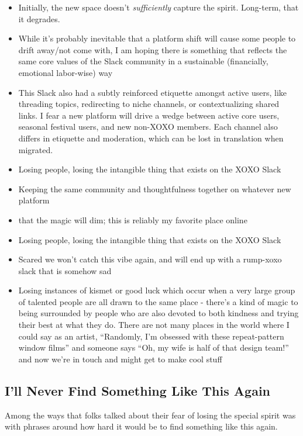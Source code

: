 \documentclass[
]{book}
\providecommand{\tightlist}{%
  \setlength{\itemsep}{0pt}\setlength{\parskip}{0pt}}
\begin{document}
\begin{itemize}
\tightlist
\item
  Initially, the new space doesn't \emph{sufficiently} capture the spirit. Long-term, that it degrades.
\item
  While it's probably inevitable that a platform shift will cause some people to drift away/not come with, I am hoping there is something that reflects the same core values of the Slack community in a sustainable (financially, emotional labor-wise) way
\item
  This Slack also had a subtly reinforced etiquette amongst active users, like threading topics, redirecting to niche channels, or contextualizing shared links. I fear a new platform will drive a wedge between active core users, seasonal festival users, and new non-XOXO members. Each channel also differs in etiquette and moderation, which can be lost in translation when migrated.
\item
  Losing people, losing the intangible thing that exists on the XOXO Slack
\item
  Keeping the same community and thoughtfulness together on whatever new platform
\item
  that the magic will dim; this is reliably my favorite place online
\item
  Losing people, losing the intangible thing that exists on the XOXO Slack
\item
  Scared we won't catch this vibe again, and will end up with a rump-xoxo slack that is somehow sad
\item
  Losing instances of kismet or good luck which occur when a very large group of talented people are all drawn to the same place - there's a kind of magic to being surrounded by people who are also devoted to both kindness and trying their best at what they do. There are not many places in the world where I could say as an artist, ``Randomly, I'm obsessed with these repeat-pattern window films'' and someone says ``Oh, my wife is half of that design team!'' and now we're in touch and might get to make cool stuff
\end{itemize}

\subsection{I'll Never Find Something Like This Again}\label{ill-never-find-something-like-this-again}

Among the ways that folks talked about their fear of losing the special spirit was with phrases around how hard it would be to find something like this again.
\end{document}
